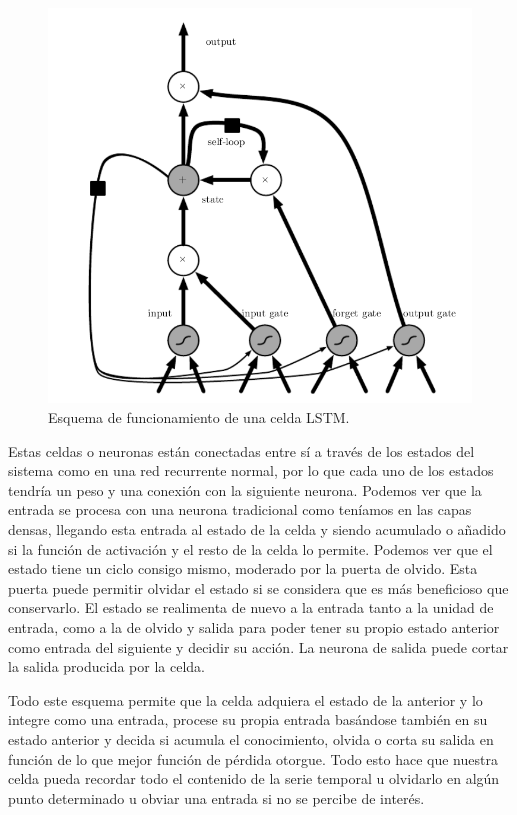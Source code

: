 \begin{figure}[H]
	\centering
	\includegraphics[scale=0.5]{imagenes/lstm.png}
	\caption{Esquema de funcionamiento de una celda LSTM.}
	\label{img:esquema-lstm}
\end{figure}

Estas celdas o neuronas están conectadas entre sí a través de los estados del sistema como en una red recurrente normal, por lo que cada uno de los estados tendría un peso y una conexión con la siguiente neurona. Podemos ver que la entrada se procesa con una neurona tradicional como teníamos en las capas densas, llegando esta entrada al estado de la celda y siendo acumulado o añadido si la función de activación y el resto de la celda lo permite. Podemos ver que el estado tiene un ciclo consigo mismo, moderado por la puerta de olvido. Esta puerta puede permitir olvidar el estado si se considera que es más beneficioso que conservarlo. El estado se realimenta de nuevo a la entrada tanto a la unidad de entrada, como a la de olvido y salida para poder tener su propio estado anterior como entrada del siguiente y decidir su acción. La neurona de salida puede cortar la salida producida por la celda.

Todo este esquema permite que la celda adquiera el estado de la anterior y lo integre como una entrada, procese su propia entrada basándose también en su estado anterior y decida si acumula el conocimiento, olvida o corta su salida en función de lo que mejor función de pérdida otorgue. Todo esto hace que nuestra celda pueda recordar todo el contenido de la serie temporal u olvidarlo en algún punto determinado u obviar una entrada si no se percibe de interés.

